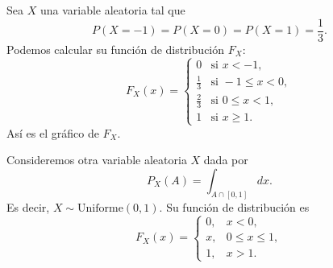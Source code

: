 \begin{example}
    Sea $X$ una variable aleatoria tal que 
    \begin{equation*}
        P(X=-1) = P(X=0) = P(X=1) = \frac{1}{3}.
    \end{equation*}
    Podemos calcular su función de distribución $F_X$:
    \begin{equation*}
        F_X(x) = 
        \begin{cases}
            0 & \text{si } x < -1, \\[6pt]
            \tfrac{1}{3} & \text{si } -1 \leq x < 0, \\[6pt]
            \tfrac{2}{3} & \text{si } 0 \leq x < 1, \\[6pt]
            1 & \text{si } x \geq 1.
        \end{cases}
    \end{equation*}
    Así es el gráfico de $F_X$.
    \begin{figure}[H]
        \centering
    \end{figure}

    Consideremos otra variable aleatoria $X$ dada por
    \begin{equation*}
        P_X(A) = \int_{A \cap [0, 1]} dx.
    \end{equation*}
    Es decir, $X \sim \text{Uniforme}(0,1)$. Su función de distribución es
    \begin{equation*}
        F_X(x) =
        \begin{cases}
            0, & x < 0, \\[6pt]
            x, & 0 \leq x \leq 1, \\[6pt]
            1, & x > 1.
        \end{cases}
    \end{equation*}


\end{example}
